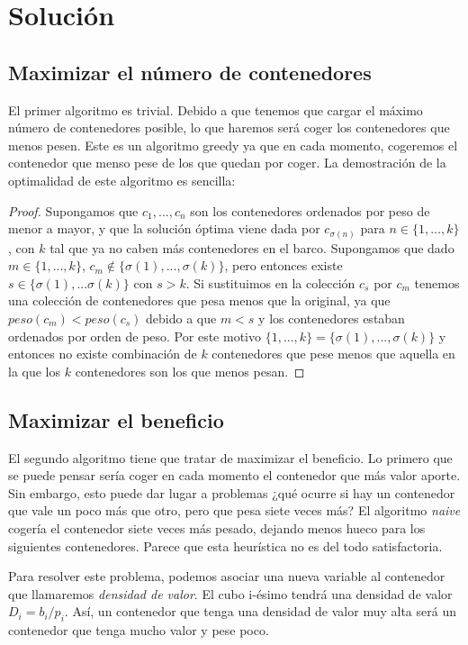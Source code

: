 \documentclass[a4paper, 11pt]{article}
\begin{document}
\section{Solución}
\subsection{Maximizar el número de contenedores}
El primer algoritmo es trivial. Debido a que tenemos que cargar el máximo número de contenedores posible, lo que haremos será coger los contenedores que menos pesen. Este es un algoritmo greedy ya que en cada momento, cogeremos el contenedor que menso pese de los que quedan por coger. La demostración de la optimalidad de este algoritmo es sencilla:
\begin{proof}
Supongamos que $c_1, ..., c_n$ son los contenedores ordenados por peso de menor a mayor, y que la solución óptima viene dada por $ c_{\sigma(n)} $ para $ n \in \{1, ..., k \} $, con $k$ tal que ya no caben más contenedores en el barco. Supongamos que dado $m \in \{1, ..., k\}$,  $c_m \not\in \{\sigma(1), ..., \sigma(k)\} $, pero entonces existe $ s \in \{\sigma(1), ... \sigma(k)\} $ con $ s > k $. Si sustituimos en la colección $c_s$ por $c_m$ tenemos una colección de contenedores que pesa menos que la original, ya que $peso(c_m) < peso(c_s)$ debido a que $m < s$ y los contenedores estaban ordenados por orden de peso. Por este motivo $\{1,...,k\} = \{\sigma(1), ..., \sigma(k)\}$ y entonces no existe combinación de $k$ contenedores que pese menos que aquella en la que los $k$ contenedores son los que menos pesan.
\end{proof}

\subsection{Maximizar el beneficio}
El segundo algoritmo tiene que tratar de maximizar el beneficio. Lo primero que se puede pensar sería coger en cada momento el contenedor que más valor aporte. Sin embargo, esto puede dar lugar a problemas ¿qué ocurre si hay un contenedor que vale un poco más que otro, pero que pesa siete veces más? El algoritmo \textit{naive} cogería el contenedor siete veces más pesado, dejando menos hueco para los siguientes contenedores. Parece que esta heurística no es del todo satisfactoria.

Para resolver este problema, podemos asociar una nueva variable al contenedor que llamaremos \textit{densidad de valor}. El cubo i-ésimo tendrá una densidad de valor $D_i = b_i/p_i$. Así, un contenedor que tenga una densidad de valor muy alta será un contenedor que tenga mucho valor y pese poco.
\end{document}
